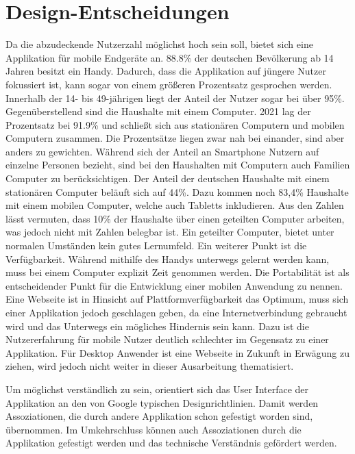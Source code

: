 \section{Design-Entscheidungen}
Da die abzudeckende Nutzerzahl möglichst hoch sein soll, bietet sich eine Applikation für mobile Endgeräte an. 88.8\% der deutschen Bevölkerung ab 14 Jahren besitzt ein Handy. Dadurch, dass die Applikation auf jüngere Nutzer fokussiert ist, kann sogar von einem größeren Prozentsatz gesprochen werden. Innerhalb der 14- bis 49-jährigen liegt der Anteil der Nutzer sogar bei über 95\%. Gegenüberstellend sind die Haushalte mit einem Computer. 2021 lag der Prozentsatz bei 91.9\% und schließt sich aus stationären Computern und mobilen Computern zusammen. Die Prozentsätze liegen zwar nah bei einander, sind aber anders zu gewichten. Während sich der Anteil an Smartphone Nutzern auf einzelne Personen bezieht, sind bei den Haushalten mit Computern auch Familien Computer zu berücksichtigen. Der Anteil der deutschen Haushalte mit einem stationären Computer beläuft sich auf 44\%. Dazu kommen noch 83,4\% Haushalte mit einem mobilen Computer, welche auch Tabletts inkludieren. Aus den Zahlen lässt vermuten, dass 10\% der Haushalte über einen geteilten Computer arbeiten, was jedoch nicht mit Zahlen belegbar ist. Ein geteilter Computer, bietet unter normalen Umständen kein gutes Lernumfeld. Ein weiterer Punkt ist die Verfügbarkeit. Während mithilfe des Handys unterwegs gelernt werden kann, muss bei einem Computer explizit Zeit genommen werden. Die Portabilität ist als entscheidender Punkt für die Entwicklung einer mobilen Anwendung zu nennen. Eine Webseite ist in Hinsicht auf Plattformverfügbarkeit das Optimum, muss sich einer Applikation jedoch geschlagen geben, da eine Internetverbindung gebraucht wird und das Unterwegs ein mögliches Hindernis sein kann. Dazu ist die Nutzererfahrung für mobile Nutzer deutlich schlechter im Gegensatz zu einer Applikation. Für Desktop Anwender ist eine Webseite in Zukunft in Erwägung zu ziehen, wird jedoch nicht weiter in dieser Ausarbeitung thematisiert. \cite{Statista:Smartphonenutzung}\cite{Statista:Computernutzung}\par
Um möglichst verständlich zu sein, orientiert sich das User Interface der Applikation an den von Google typischen Designrichtlinien. Damit werden Assoziationen, die durch andere Applikation schon gefestigt worden sind, übernommen. Im Umkehrschluss können auch Assoziationen durch die Applikation gefestigt werden und das technische Verständnis gefördert werden.
